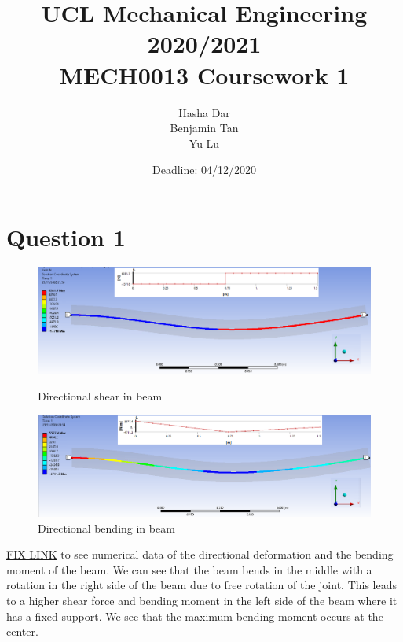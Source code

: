 \documentclass[11pt]{article}
\numberwithin{equation}{section}
\begin{document}
\title{\textbf{UCL Mechanical Engineering 2020/2021}\\MECH0013 Coursework 1}
\date{Deadline: 04/12/2020}
\author{Hasha Dar\\
Benjamin Tan\\
Yu Lu}
\maketitle
\tableofcontents
\newpage
\section{Question 1}
\begin{figure}[H]
  \centering
  \begin{minipage}[b]{0.49\textwidth}
    \includegraphics[width=\textwidth]{./img/DirectionalShearQ1.png}
    \caption{Directional shear in beam}
  \end{minipage}
  \hfill
  \begin{minipage}[b]{0.49\textwidth}
    \includegraphics[width=\textwidth]{./img/DirectionalBendingQ1.png}
    \caption{Directional bending in beam}
  \end{minipage}
\end{figure}
\href{https://github.com/hashadar/ME-Latex/tree/master/MECH0013/Topic%20Notes}{FIX LINK} to see numerical data of the directional deformation and the bending moment of the beam. We can see that the beam bends in the middle with a rotation in the right side of the beam due to free rotation of the joint. This leads to a higher shear force and bending moment in the left side of the beam where it has a fixed support. We see that the maximum bending moment occurs at the center. 
\end{document}
